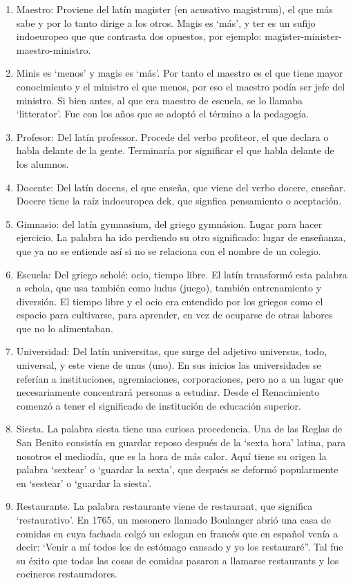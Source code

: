 \documentclass{mylib/reporte}
\begin{document}
\begin{enumerate}
	\item Maestro: Proviene del latín magister (en acusativo magistrum), el que más sabe y por lo tanto dirige a los otros. Magis es ‘más’, y ter es un sufijo indoeuropeo que que contrasta dos opuestos, por ejemplo: magister-minister-maestro-ministro.
	\item Minis es ‘menos’ y magis es ‘más’. Por tanto el maestro es el que tiene mayor conocimiento y el ministro el que menos, por eso el maestro podía ser jefe del ministro. Si bien antes, al que era maestro de escuela, se lo llamaba ‘litterator’. Fue con los años que se adoptó el término a la pedagogía.
	\item Profesor: Del latín professor. Procede del verbo profiteor, el que declara o habla delante de la gente. Terminaría por significar el que habla delante de los alumnos.
	\item Docente: Del latín docens, el que enseña, que viene del verbo docere, enseñar. Docere tiene la raíz indoeuropea dek, que signfica pensamiento o aceptación.
	\item Gimnasio: del latín gymnasium, del griego gymnásion. Lugar para hacer ejercicio. La palabra ha ido perdiendo su otro significado: lugar de enseñanza, que ya no se entiende así si no se relaciona con el nombre de un colegio.
	\item Escuela: Del griego scholé: ocio, tiempo libre.  El latín transformó esta palabra a schola, que usa también como ludus (juego), también entrenamiento y diversión. El tiempo libre y el ocio era entendido por los griegos como el espacio para cultivarse, para aprender, en vez de ocuparse de otras labores que no lo alimentaban.
	\item Universidad: Del latín universitas, que surge del adjetivo universus, todo, universal, y este viene de unus (uno). En sus inicios las universidades se referían a instituciones, agremiaciones, corporaciones, pero no a un lugar que necesariamente concentrará personas a estudiar. Desde el Renacimiento comenzó a tener el significado de institución de educación superior.
	\item Siesta. La palabra siesta tiene una curiosa procedencia. Una de las Reglas de San Benito consistía en guardar reposo después de la ‘sexta hora’ latina, para nosotros el mediodía, que es la hora de más calor. Aquí tiene su origen la palabra ‘sextear’ o ‘guardar la sexta’, que después se deformó popularmente en ‘sestear’ o ‘guardar la siesta’.
	\item Restaurante. La palabra restaurante viene de restaurant, que significa ‘restaurativo’. En 1765, un mesonero llamado Boulanger abrió una casa de comidas en cuya fachada colgó un eslogan en francés que en español venía a decir: ‘Venir a mí todos los de estómago cansado y yo los restauraré”. Tal fue su éxito que todas las cosas de comidas pasaron a llamarse restaurants y los cocineros restauradores.

\end{enumerate}
\end{document}
